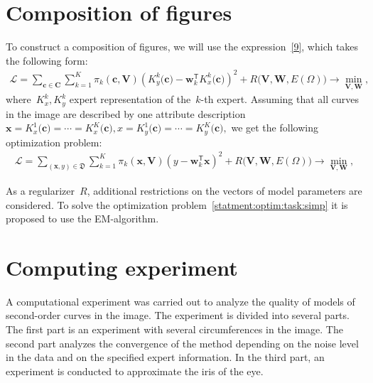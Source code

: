 \documentclass[12pt, twoside]{article}
\numberwithin{equation}{section}
\begin{document}
\section{Composition of figures }
To construct a composition of figures, we will use the expression~\eqref{9}, which takes the following form:
\begin{equation} 
\label{statment:optim:task}
\begin{aligned}
\mathcal{L} = \sum\limits_{\mathbf{c} \in \mathbf{C}} \sum\limits_{k = 1}^{K} \pi_k(\mathbf{c}, \mathbf{V})\left(K^{k}_y\bigr(\mathbf{c}\bigr) - \mathbf{w}_k^{\mathsf{T}}K^{k}_x\bigr(\mathbf{c}\bigr)\right)^2 + R\bigl(\mathbf{V}, \mathbf{W}, E(\Omega)\bigr) \rightarrow \min_{\mathbf{V}, \mathbf{W}},
\end{aligned}
\end{equation} 
where~$K^{k}_x, K^{k}_y$ expert representation of the~$k$-th expert. Assuming that all curves in the image are described by one attribute description $\mathbf {x} =K^{1}_x\bigr(\mathbf{c}\bigr)=\cdots=K^{K}_x\bigr(\mathbf{c}\bigr), x= K^{1}_y\bigr(\mathbf{c}\bigr)=\cdots=K^{K}_y\bigr(\mathbf{c}\bigr),$ we get the following optimization problem:
\begin{equation} 
\label{statment:optim:task:simp}
\begin{aligned}
\mathcal{L} = \sum\limits_{\left(\mathbf{x}, y\right) \in \mathfrak{D}} \sum\limits_{k = 1}^{K} \pi_k(\mathbf{x}, \mathbf{V})\left(y - \mathbf{w}_k^{\mathsf{T}}\mathbf{x}\right)^2 + R\bigl(\mathbf{V}, \mathbf{W}, E(\Omega)\bigr) \rightarrow \min_{\mathbf{V}, \mathbf{W}},
\end{aligned}
\end{equation} 

As a regularizer~$R$, additional restrictions on the vectors of model parameters are considered. To solve the optimization problem~\eqref{statment:optim:task:simp} it is proposed to use the EM-algorithm.

\section{ Computing experiment }
A computational experiment was carried out to analyze the quality of models of second-order curves in the image. The experiment is divided into several parts. The first part is an experiment with several circumferences in the image. The second part analyzes the convergence of the method depending on the noise level in the data and on the specified expert information. In the third part, an experiment is conducted to approximate the iris of the eye.
\end{document}
